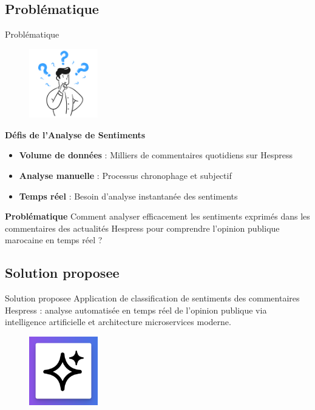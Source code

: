 \subsection{Problématique}
\begin{frame}{Problématique}
    \begin{figure}[H]
        \centering
        \includegraphics[height=3cm]{assets/images/question.png}
    \end{figure}
    
    \vspace{0.5cm}
    
    \begin{block}{\centering \textbf{Défis de l'Analyse de Sentiments}}
        \begin{itemize}
            \setlength\itemsep{0.6em}
            \item \textbf{Volume de données} : Milliers de commentaires quotidiens sur Hespress
            \item \textbf{Analyse manuelle} : Processus chronophage et subjectif
            \item \textbf{Temps réel} : Besoin d'analyse instantanée des sentiments
        \end{itemize}
    \end{block}
    
    \vspace{0.3cm}
    
    \begin{alertblock}{\centering \textbf{Problématique}}
        \centering
        Comment analyser efficacement les sentiments exprimés dans les commentaires des actualités Hespress pour comprendre l'opinion publique marocaine en temps réel ?
    \end{alertblock}
\end{frame}

\subsection{Solution proposee}
\begin{frame}{Solution proposee}
    Application de classification de sentiments des commentaires Hespress : analyse automatisée en temps réel de l'opinion publique via intelligence artificielle et architecture microservices moderne.
    \begin{figure}[H]
        \centering
        \includegraphics[height=3cm]{assets/images/ia.png}
    \end{figure}
\end{frame}

